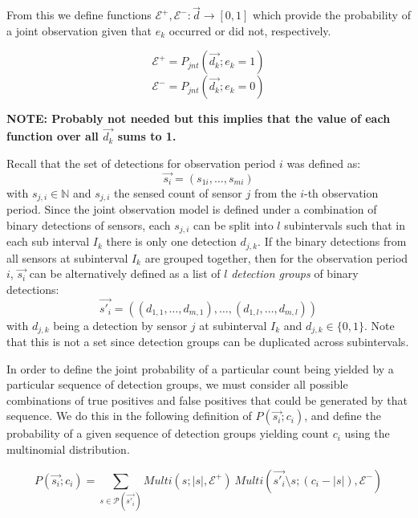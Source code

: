 From this we define functions $\mathcal E^+, \mathcal E^- : \vec{d} \rightarrow [0,1]$ which provide the probability of a joint observation given that $e_k$ occurred or did not, respectively. 

\begin{equation}
\mathcal E^+ = P_{jnt}(\vec{d_k} ; e_k=1)
\end{equation}
\begin{equation}
\mathcal E^- = P_{jnt}(\vec{d_k} ; e_k=0)
\end{equation}


\textbf{NOTE: Probably not needed but this implies that the value of each function over all $\vec{d_k}$ sums to 1.}

Recall that the set of detections for observation period $i$ was defined as:
\begin{equation*}
    \vec{s_i} = (s_{1i}, \ldots, s_{mi})
\end{equation*}
with $s_{j,i} \in \mathbb N$ and $s_{j,i}$ the sensed count of sensor $j$ from the $i$-th observation period. Since the joint observation model is defined under a combination of binary detections of sensors, each $s_{j,i}$ can be split into $l$ subintervals such that in each sub interval $I_k$ there is only one detection $d_{j,k}$. If the binary detections from all sensors at subinterval $I_k$ are grouped together, then for the observation period $i$, $\vec{s_i}$ can be alternatively defined as a list of $l$ \emph{detection groups} of binary detections:
\begin{equation}
    \label{eq:s_i_definition}
    \vec{s'_i} = ((d_{1,1}, \ldots, d_{m,1}), \ldots, (d_{1,l}, \ldots, d_{m,l}))
\end{equation}
\noindent with $d_{j,k}$ being a detection by sensor $j$ at subinterval $I_k$ and $d_{j,k} \in \{0, 1\}$. Note that this is not a set since detection groups can be duplicated across subintervals.

In order to define the joint probability of a particular count being yielded by a particular sequence of detection groups, we must consider all possible combinations of true positives and false positives that could be generated by that sequence. We do this in the following definition of $P(\vec{s_i} ; c_i)$, and define the probability of a given sequence of detection groups yielding count $c_i$ using the multinomial distribution.

\begin{equation}
\label{eq:codependent_sensor_likelihood}
P(\vec{s_i} ; c_i) = \sum\limits_{s \in \mathcal{P}(\vec{s'_i})} Multi(s ; |s|, \mathcal E^+) ~ Multi(\vec{s'_i}\setminus s ; (c_i - |s|), \mathcal E^-)
\end{equation}

